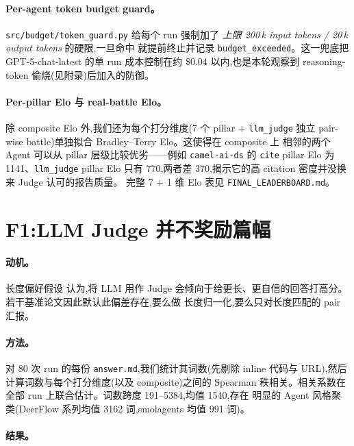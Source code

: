 \documentclass[UTF8,11pt]{ctexart}
\begin{document}
\paragraph{Per-agent token budget guard。}
\texttt{src/budget/token\_guard.py} 给每个 run 强制加了
\emph{上限 200\,k input tokens / 20\,k output tokens} 的硬限,一旦命中
就提前终止并记录 \texttt{budget\_exceeded}。这一兜底把 GPT-5-chat-latest
的单 run 成本控制在约 \$0.04 以内,也是本轮观察到 reasoning-token
偷烧(见附录)后加入的防御。

\paragraph{Per-pillar Elo 与 real-battle Elo。}
除 composite Elo 外,我们还为每个打分维度(7 个 pillar + \texttt{llm\_judge}
独立 pair-wise battle)单独拟合 Bradley--Terry Elo。这使得在 composite 上
相邻的两个 Agent 可以从 pillar 层级比较优劣——例如 \texttt{camel-ai-ds}
的 \texttt{cite} pillar Elo 为 1141、\texttt{llm\_judge} pillar Elo 只有
770,两者差 370,揭示它的高 citation 密度并没换来 Judge 认可的报告质量。
完整 7 + 1 维 Elo 表见 \texttt{FINAL\_LEADERBOARD.md}。

\section{F1:LLM Judge 并不奖励篇幅}
\label{sec:length}

\paragraph{动机。}
长度偏好假设 \citep{wataoka-2024,arena-hard-2024} 认为,将 LLM 用作 Judge
会倾向于给更长、更自信的回答打高分。若干基准论文因此默认此偏差存在,要么做
长度归一化,要么只对长度匹配的 pair 汇报。

\paragraph{方法。}
对 80 次 run 的每份 \texttt{answer.md},我们统计其词数(先剔除 inline
代码与 URL),然后计算词数与每个打分维度(以及 composite)之间的 Spearman
秩相关。相关系数在全部 run 上联合估计。词数跨度 191--5384,均值 1540,存在
明显的 Agent 风格聚类(DeerFlow 系列均值 3162 词,smolagents 均值 991 词)。

\paragraph{结果。}
\begin{table}[h]
  \centering
  \small
  
  \caption{答案词数与各打分维度的 Spearman $\rho$。全部
    $|\rho| < 0.4$;\texttt{llm\_judge} 与 \texttt{checklist} 两个维度
    与词数 \emph{负}相关。表格由
    \texttt{data/results/length\_ablation.json} 自动生成。}
  \label{tab:length}
\end{table}
\end{document}
